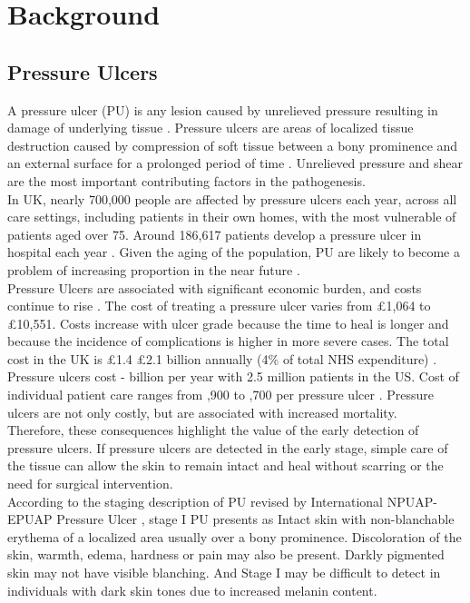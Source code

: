 \chapter{Background}
\section{Pressure Ulcers}
\indent A pressure ulcer (PU) is any lesion caused by unrelieved pressure resulting in damage of underlying tissue \cite{Wikipedia}. Pressure ulcers are areas of localized tissue destruction caused by compression of soft tissue between a bony prominence and an external surface for a prolonged period of time \cite{Treatment}. Unrelieved pressure and shear are the most important contributing factors in the pathogenesis.\\
\indent In UK, nearly 700,000 people are affected by pressure ulcers each year, across all care settings, including patients in their own homes, with the most vulnerable of patients aged over 75. Around 186,617 patients develop a pressure ulcer in hospital each year \cite{NHS}. Given the aging of the population, PU are likely to become a problem of increasing proportion in the near future \cite{Maklebust}.\\
\indent Pressure Ulcers are associated with significant economic burden, and costs continue to rise \cite{Allman}. The cost of treating a pressure ulcer varies from \pounds 1,064 to \pounds 10,551. Costs increase with ulcer grade because the time to heal is longer and because the incidence of complications is higher in more severe cases. The total cost in the UK is \pounds 1.4 \- \pounds 2.1 billion annually (4\% of total NHS expenditure) \cite{Bennett}. Pressure ulcers cost  - billion per year with 2.5 million patients in the US. Cost of individual patient care ranges from ,900 to ,700 per pressure ulcer \cite{HumanService}. Pressure ulcers are not only costly, but are associated with increased mortality.\\
\indent Therefore, these consequences highlight the value of the early detection of pressure ulcers. If pressure ulcers are detected in the early stage, simple care of the tissue can allow the skin to remain intact and heal without scarring or the need for surgical intervention. \\
\indent According to the staging description of PU revised by International NPUAP- EPUAP Pressure Ulcer \cite{Epuap}, stage I PU presents as Intact skin with non-blanchable erythema of a localized area usually over a bony prominence. Discoloration of the skin, warmth, edema, hardness or pain may also be present. Darkly pigmented skin may not have visible blanching. And Stage I may be difficult to detect in individuals with dark skin tones due to increased melanin content. 

